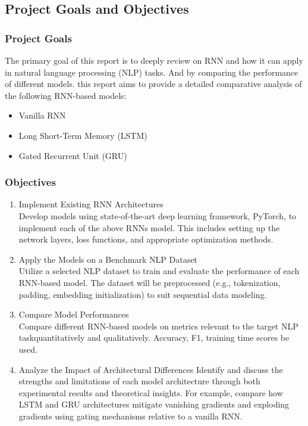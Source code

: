 \documentclass[12pt,a4paper]{article}
\begin{document}
\newpage

\subsection{Project Goals and Objectives}

\subsubsection{Project Goals}
The primary goal of this report is to deeply review on RNN and how it can apply in natural language processing (NLP) tasks. And by comparing the performance of different models. this report aims to provide a detailed comparative analysis of the following RNN-based models:
\begin{itemize}
    \item Vanilla RNN
    \item Long Short-Term Memory (LSTM)
    \item Gated Recurrent Unit (GRU)
\end{itemize}

\subsubsection{Objectives}
\begin{enumerate}
    \item Implement Existing RNN Architectures\\
    Develop models using state-of-the-art deep learning framework, PyTorch, to implement each of the above RNNs model. This includes setting up the network layers, loss functions, and appropriate optimization methods.
    \item Apply the Models on a Benchmark NLP Dataset\\
    Utilize a selected NLP dataset to train and evaluate the performance of each RNN-based model. The dataset will be preprocessed (e.g., tokenization, padding, embedding initialization) to suit sequential data modeling.
    \item Compare Model Performances\\
    Compare different RNN-based models on metrics relevant to the target NLP taskquantitatively and qualitatively. Accuracy, F1, training time scores be used.
    \item Analyze the Impact of Architectural Differences
    Identify and discuss the strengths and limitations of each model architecture through both experimental results and theoretical insights. For example, compare how LSTM and GRU architectures mitigate vanishing gradients and exploding gradients using gating mechanisms relative to a vanilla RNN.
\end{enumerate}
\end{document}
